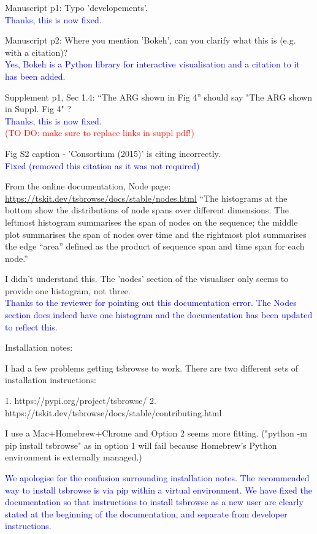 \documentclass{article}
\begin{document}
Manuscript p1: Typo 'developements'.\\
\textcolor{blue}{Thanks, this is now fixed.}

Manuscript p2: Where you mention 'Bokeh', can you clarify what this is (e.g. with a citation)?\\
\textcolor{blue}{Yes, Bokeh is a Python library for interactive visualisation and a citation to it 
has been added.}

Supplement p1, Sec 1.4: ``The ARG shown in Fig 4'' should say "The ARG shown in Suppl. Fig 4" ?\\
\textcolor{blue}{Thanks, this is now fixed.}\\
\textcolor{red}{(TO DO: make sure to replace links in suppl pdf!)}

Fig S2 caption - 'Consortium (2015)' is citing incorrectly.\\
\textcolor{blue}{Fixed (removed this citation as it was not required)}

From the online documentation, Node page: \url{https://tskit.dev/tsbrowse/docs/stable/nodes.html}
``The histograms at the bottom show the distributions of node spans over different dimensions. 
The leftmost histogram summarises the span of nodes on the sequence; the middle plot summarises 
the span of nodes over time and the rightmost plot summarises the edge “area” defined as the product 
of sequence span and time span for each node.''

I didn't understand this. The 'nodes' section of the visualiser only seems to provide one histogram, 
not three.\\

\textcolor{blue}{Thanks to the reviewer for pointing out this documentation error. The Nodes section 
does indeed have one histogram and the documentation has been updated to reflect this.}

Installation notes:

I had a few problems getting tsbrowse to work. There are two different sets of installation instructions:

1. https://pypi.org/project/tsbrowse/
2. https://tskit.dev/tsbrowse/docs/stable/contributing.html

I use a Mac+Homebrew+Chrome and Option 2 seems more fitting. ("python -m pip install tsbrowse" as in 
option 1 will fail because Homebrew's Python environment is externally managed.)

\textcolor{blue}{We apologise for the confusion surrounding installation notes. The recommended way to install 
tsbrowse is via pip within a virtual environment. We have fixed the documentation so that instructions 
to install tsbrowse as a new user are clearly stated at the beginning of the documentation,
and separate from developer instructions.}
\end{document}
